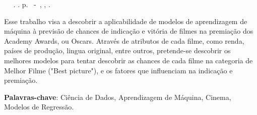 \setlength{\absparsep}{18pt} %
\begin{resumo}
	\begin{flushleft} 
			\setlength{\absparsep}{0pt} %
			\SingleSpacing 
			\imprimirautorabr~ ~\textbf{\imprimirtitulo}.	\imprimirdata. \pageref{LastPage}p. 
			\imprimirtipotrabalho~-~\imprimirinstituicao, \imprimirlocal, \imprimirdata. 
 	\end{flushleft}
\OnehalfSpacing 			
 Esse trabalho visa a descobrir a aplicabilidade de modelos de aprendizagem de máquina à previsão de chances de indicação e vitória de filmes na premiação dos Academy Awards, ou Oscars. Através de atributos de cada filme, como renda, países de produção, lingua original, entre outros, pretende-se descobrir os melhores modelos para tentar descobrir as chances de cada filme na categoria de Melhor Filme ("Best picture"), e os fatores que influenciam na indicação e premiação.
 

 \textbf{Palavras-chave}: Ciência de Dados, Aprendizagem de Máquina, Cinema, Modelos de Regressão.
\end{resumo}
